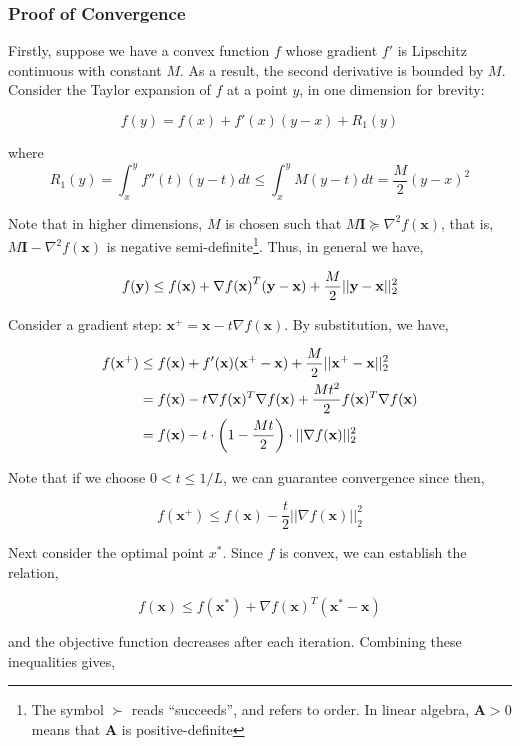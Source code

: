 \documentclass[11pt]{amsart}
\begin{document}
\subsubsection{Proof of Convergence}

Firstly, suppose we have a convex function $f$ whose gradient $f'$ is Lipschitz continuous with constant $M$. As a result, the second derivative is bounded by $M$. Consider the Taylor expansion of $f$ at a point $y$, in one dimension for brevity:

$$f(y) = f(x) + f'(x)(y - x) + R_1(y)$$

where $$
R_1(y) = \int_{x}^y f''(t)(y - t)dt \leq \int_{x}^y M(y - t)dt = \frac{M}{2}(y - x)^2
$$

Note that in higher dimensions, $M$ is chosen such that $M\mathbf{I} \succeq \nabla^2f(\mathbf{x})$, that is, $M\mathbf{I} - \nabla^2f(\mathbf{x})$ is negative semi-definite\footnote{The symbol $\succ$ reads ``succeeds'', and refers to order. In linear algebra, $\mathbf{A} > 0$ means that $\mathbf{A}$ is positive-definite}. Thus, in general we have,

$$f(\mathbf{y}) \leq f(\mathbf{x}) + \nabla{f(\mathbf{x})}^T(\mathbf{y} - \mathbf{x}) + \frac{M}{2}||\mathbf{y} - \mathbf{x}||_2^2 \notag$$

Consider a gradient step: $\mathbf{x}^{+} = \mathbf{x} - t\nabla{f(\mathbf{x})}$. By substitution, we have,

\begin{align}
f(\mathbf{x^{+}}) &\leq f(\mathbf{x}) + f'(\mathbf{x})(\mathbf{x^{+}} - \mathbf{x}) + \frac{M}{2}||\mathbf{x^{+}} - \mathbf{x}||_2^2 \notag \\
&= f(\mathbf{x}) - t\nabla f(\mathbf{x})^T\nabla f(\mathbf{x}) + \frac{Mt^2}{2}f(\mathbf{x})^T\nabla f(\mathbf{x}) \notag \\
&= f(\mathbf{x}) - t\cdot\bigg(1 - \frac{Mt}{2}\bigg)\cdot||\nabla f(\mathbf{x})||_2^2 \notag
\end{align}

Note that if we choose $0 < t \leq 1/L$, we can guarantee convergence since then,

$$f(\mathbf{x^+}) \leq f(\mathbf{x}) - \frac{t}{2}||\nabla f(\mathbf{x})||_2^2$$

Next consider the optimal point $x^*$. Since $f$ is convex, we can establish the relation,

$$f(\mathbf{x}) \leq f(\mathbf{x^*}) + \nabla f(\mathbf{x})^T(\mathbf{x^*} - \mathbf{x})$$

and the objective function decreases after each iteration. Combining these inequalities gives,
\end{document}
